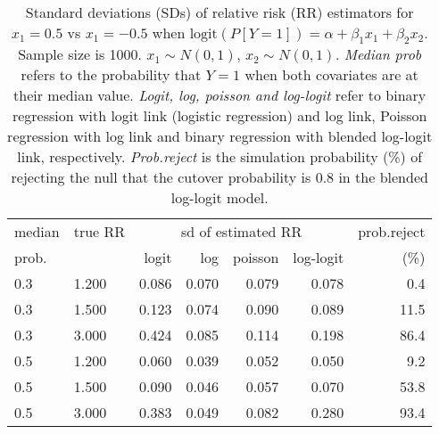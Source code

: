 \documentclass[12pt,a4paper]{article}
\begin{document}
\begin{table}[H] 
\small\sf\centering 
\caption{Standard deviations (SDs) of relative risk (RR) estimators for $x_1=0.5$ vs $x_1=-0.5$ when $\mbox{logit}(P[Y=1])=\alpha+\beta_1 x_1 + \beta_2 x_2$. Sample size is 1000. $x_1 \sim $$N(0,1)$, $x_2 \sim N(0,1)$. {\it Median prob} refers to the probability that $Y=1$ when both covariates are at their median value. {\it Logit, log, poisson and log-logit} refer to binary regression with logit link (logistic regression) and log link, Poisson regression with log link and binary regression with blended log-logit link, respectively. {\it Prob.reject} is the simulation probability (\%) of rejecting the null that the cutover probability is $0.8$ in the blended log-logit model.} 
\begin{tabular}{llrrrrr} 
\toprule 
median & true RR & \multicolumn{4}{c}{sd of estimated RR} & prob.reject \\ 
prob. & & logit & log & poisson & log-logit  & (\%) \\ \midrule 
0.3 & 1.200 & 0.086 & 0.070 & 0.079 & 0.078 &  0.4 \\  
0.3 & 1.500 & 0.123 & 0.074 & 0.090 & 0.089 & 11.5 \\  
0.3 & 3.000 & 0.424 & 0.085 & 0.114 & 0.198 & 86.4 \\  
0.5 & 1.200 & 0.060 & 0.039 & 0.052 & 0.050 &  9.2 \\  
0.5 & 1.500 & 0.090 & 0.046 & 0.057 & 0.070 & 53.8 \\  
0.5 & 3.000 & 0.383 & 0.049 & 0.082 & 0.280 & 93.4 \\  
\bottomrule 
\end{tabular} 
\end{table} 
\end{document}
